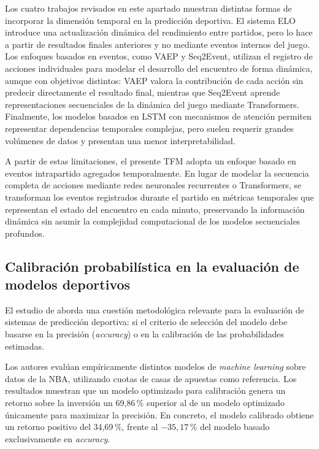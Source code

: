 Los cuatro trabajos revisados en este apartado muestran distintas formas de incorporar la dimensión temporal en la predicción deportiva. El sistema ELO introduce una actualización dinámica del rendimiento entre partidos, pero lo hace a partir de resultados finales anteriores y no mediante eventos internos del juego. Los enfoques basados en eventos, como VAEP y Seq2Event, utilizan el registro de acciones individuales para modelar el desarrollo del encuentro de forma dinámica, aunque con objetivos distintos: VAEP valora la contribución de cada acción sin predecir directamente el resultado final, mientras que Seq2Event aprende representaciones secuenciales de la dinámica del juego mediante Transformers. Finalmente, los modelos basados en LSTM con mecanismos de atención permiten representar dependencias temporales complejas, pero suelen requerir grandes volúmenes de datos y presentan una menor interpretabilidad.

A partir de estas limitaciones, el presente TFM adopta un enfoque basado en eventos intrapartido agregados temporalmente. En lugar de modelar la secuencia completa de acciones mediante redes neuronales recurrentes o Transformers, se transforman los eventos registrados durante el partido en métricas temporales que representan el estado del encuentro en cada minuto, preservando la información dinámica sin asumir la complejidad computacional de los modelos secuenciales profundos.

\subsection{Calibración probabilística en la evaluación de modelos deportivos}

El estudio de \cite{walsh2024calibration} aborda una cuestión metodológica relevante para la evaluación de sistemas de predicción deportiva: si el criterio de selección del modelo debe basarse en la precisión (\textit{accuracy}) o en la calibración de las probabilidades estimadas.

Los autores evalúan empíricamente distintos modelos de \textit{machine learning} sobre datos de la NBA, utilizando cuotas de casas de apuestas como referencia. Los resultados muestran que un modelo optimizado para calibración genera un retorno sobre la inversión un 69,86\,\% superior al de un modelo optimizado únicamente para maximizar la precisión. En concreto, el modelo calibrado obtiene un retorno positivo del 34,69\,\%, frente al $-35{,}17$\,\% del modelo basado exclusivamente en \textit{accuracy}.

